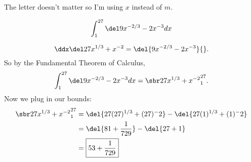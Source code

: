 \renewcommand{\avibounds}{_1^{27}}
\renewcommand{\avifn}{\del{9x^{-2/3} - 2x^{-3}}}
\renewcommand{\avianti}{27x^{1/3} + x^{-2}}
\renewcommand{\aviconstant}{}

The letter doesn't matter so I'm using $x$ instead of $m$.

\begin{probboxed}
    \[
        \aviprob{}
    \]
\end{probboxed}

\aviinversepowerrule
\[
    \ddx\del\avianti{} = \avifn{}.
\]
So by the Fundamental Theorem of Calculus,
\[
    \aviprob{}
    = \avibounded{}.
\]
Now we plug in our bounds:
\begin{align*}
    \avibounded{}
    &= \del{27(27)^{1/3} + (27)^-2} - \del{27(1)^{1/3} + (1)^-2} \\
    &= \del{81 + \frac{1}{729}} - \del{27 + 1} \\
    &= \boxed{53 + \frac{1}{729}}
\end{align*}

